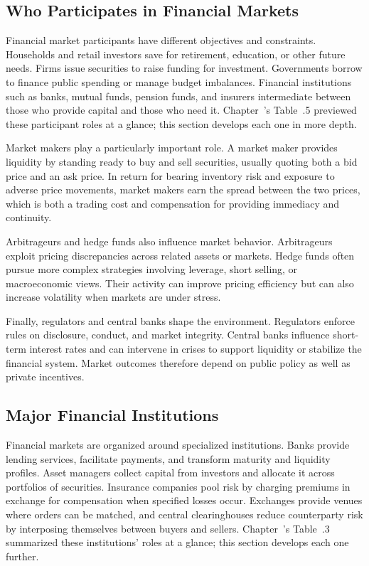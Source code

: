 \documentclass[../ai_in_finance]{subfiles}
\begin{document}
\subsection{Who Participates in Financial Markets}

Financial market participants have different objectives and constraints. Households and retail investors save for retirement, education, or other future needs. Firms issue securities to raise funding for investment. Governments borrow to finance public spending or manage budget imbalances. Financial institutions such as banks, mutual funds, pension funds, and insurers intermediate between those who provide capital and those who need it. Chapter~'s Table~.5 previewed these participant roles at a glance; this section develops each one in more depth.

Market makers play a particularly important role. A market maker provides liquidity by standing ready to buy and sell securities, usually quoting both a bid price and an ask price. In return for bearing inventory risk and exposure to adverse price movements, market makers earn the spread between the two prices, which is both a trading cost and compensation for providing immediacy and continuity.

Arbitrageurs and hedge funds also influence market behavior. Arbitrageurs exploit pricing discrepancies across related assets or markets. Hedge funds often pursue more complex strategies involving leverage, short selling, or macroeconomic views. Their activity can improve pricing efficiency but can also increase volatility when markets are under stress.

Finally, regulators and central banks shape the environment. Regulators enforce rules on disclosure, conduct, and market integrity. Central banks influence short-term interest rates and can intervene in crises to support liquidity or stabilize the financial system. Market outcomes therefore depend on public policy as well as private incentives.

\subsection{Major Financial Institutions}

Financial markets are organized around specialized institutions. Banks provide lending services, facilitate payments, and transform maturity and liquidity profiles. Asset managers collect capital from investors and allocate it across portfolios of securities. Insurance companies pool risk by charging premiums in exchange for compensation when specified losses occur. Exchanges provide venues where orders can be matched, and central clearinghouses reduce counterparty risk by interposing themselves between buyers and sellers. Chapter~'s Table~.3 summarized these institutions' roles at a glance; this section develops each one further.
\end{document}
